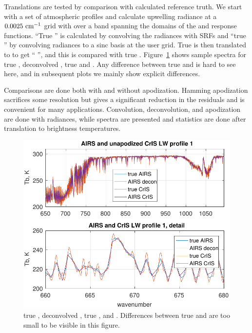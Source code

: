 \documentclass[10pt,twocolumn]{article}
\begin{document}
Translations are tested by comparison with calculated reference
truth.  We start with a set of atmospheric profiles and calculate
upwelling radiance at a $0.0025~\mbox{cm$^{-1}$}$ grid with {\kcarta}
\cite{kcarta1} over a band spanning the domains of the {\airs} and
{\cris} response functions.  ``True {\airs}'' is calculated by
convolving the {\kcarta} radiances with {\airs} SRFs and ``true
{\cris}'' by convolving {\kcarta} radiances to a sinc basis at the
{\cris} user grid.  True {\airs} is then translated to {\cris} to
get ``{\airs} {\cris}'', and this is compared with true {\cris}.
Figure~\ref{specLW} shows sample spectra for true {\airs},
deconvolved {\airs}, true {\cris} and {\airs} {\cris}.  Any
difference between true {\cris} and {\airs} {\cris} is hard to see
here, and in subsequent plots we mainly show explicit differences.

Comparisons are done both with and without apodization.  Hamming
apodization \cite{wiki:wind} sacrifices some resolution but gives a
significant reduction in the residuals and is convenient for many
applications.  Convolution, deconvolution, and apodization are done
with radiances, while spectra are presented and statistics are done
after translation to brightness temperatures.

\begin{figure} %
  \centering
  \includegraphics[width=\linewidth]{figures/a2cris_spec_LW.pdf}
  \caption{true {\airs}, deconvolved {\airs}, true {\cris}, and {\airs}
    {\cris}.  Differences between true {\cris} and {\airs} {\cris} are too
    small to be visible in this figure.}
  \label{specLW}
\end{figure}
\end{document}
